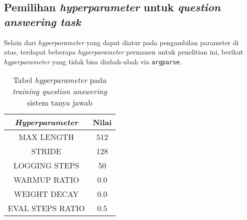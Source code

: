 \subsection{Pemilihan \emph{hyperparameter} untuk \emph{question answering task}}
Selain dari \emph{hyperparameter} yang dapat diatur pada pengambilan parameter di atas, terdapat beberapa \emph{hyperparameter} permanen untuk penelitian ini, berikut \emph{hyperparameter} yang tidak bisa diubah-ubah via \texttt{argparse}.

\begin{table}[h]
\centering
\begin{tabular}{||c | c||} 
 \hline
 \emph{Hyperparameter} & Nilai \\ [0.5ex] 
 \hline\hline
 MAX LENGTH & 512 \\ 
 STRIDE & 128 \\
 LOGGING STEPS & 50 \\
 WARMUP RATIO & 0.0 \\
 WEIGHT DECAY & 0.0 \\ 
 EVAL STEPS RATIO & 0.5 \\ [1ex] 
 \hline\hline
\end{tabular}
\caption{Tabel \emph{hyperparameter} pada \emph{training question answering} sistem tanya jawab}
\end{table}

